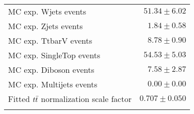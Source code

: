 \begin{table}[h!]
\begin{center}
{\begin{tabular*}{\textwidth}{@{\extracolsep{\fill}}lr}
        MC exp. Wjets events         & $51.34 \pm 6.02$                 \\
        MC exp. Zjets events         & $1.84 \pm 0.58$                 \\
        MC exp. TtbarV events         & $8.78 \pm 0.90$                      \\
        MC exp. SingleTop events         & $54.53 \pm 5.03$                  \\
        MC exp. Diboson events         & $7.58 \pm 2.87$                     \\
        MC exp. Multijets events         & $0.00 \pm 0.00$                   \\
\noalign{\smallskip}\hline\noalign{\smallskip}
Fitted $t\bar{t}$ normalization scale factor & $0.707 \pm 0.050$ \\
\noalign{\smallskip}\hline\noalign{\smallskip}
\end{tabular*}
}
\end{center}
\end{table}
%